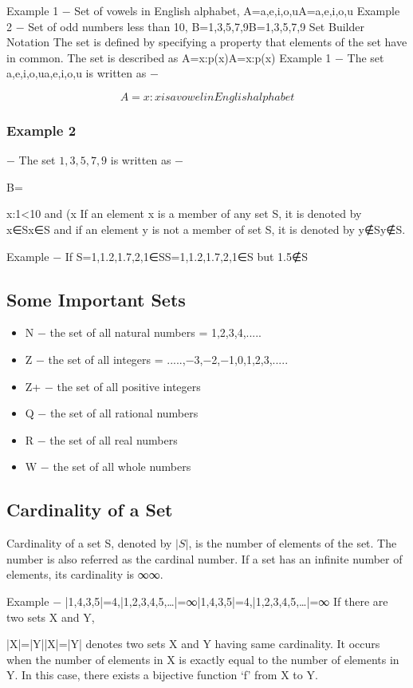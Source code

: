 \documentclass[12pt]{article}
\begin{document}
Example 1 − Set of vowels in English alphabet, A={a,e,i,o,u}A={a,e,i,o,u}
Example 2 − Set of odd numbers less than 10, B={1,3,5,7,9}B={1,3,5,7,9}
Set Builder Notation
The set is defined by specifying a property that elements of the set have in common. The set is described as A={x:p(x)}A={x:p(x)}
Example 1 − The set {a,e,i,o,u}{a,e,i,o,u} is written as −

\[A={x:x is a vowel in English alphabet}\]
\subsubsection*{Example 2} − The set ${1,3,5,7,9}$ is written as −

B={x:1\leqx<10 and (x%
If an element x is a member of any set S, it is denoted by x∈Sx∈S and if an element y is not a member of set S, it is denoted by y∉Sy∉S.

Example − If S={1,1.2,1.7,2},1∈SS={1,1.2,1.7,2},1∈S but 1.5∉S
\subsection{Some Important Sets}
\begin{itemize}
\item N − the set of all natural numbers = {1,2,3,4,.....}
\item Z − the set of all integers = {.....,−3,−2,−1,0,1,2,3,.....}
\item Z+ − the set of all positive integers
\item Q − the set of all rational numbers
\item R − the set of all real numbers
\item W − the set of all whole numbers
\end{itemize}

\subsection{Cardinality of a Set}
Cardinality of a set S, denoted by $|S|$, is the number of elements of the set. The number is also referred as the cardinal number. If a set has an infinite number of elements, its cardinality is ∞∞.

Example − |{1,4,3,5}|=4,|{1,2,3,4,5,…}|=∞|{1,4,3,5}|=4,|{1,2,3,4,5,…}|=∞
If there are two sets X and Y,

|X|=|Y||X|=|Y| denotes two sets X and Y having same cardinality. It occurs when the number of elements in X is exactly equal to the number of elements in Y. In this case, there exists a bijective function ‘f’ from X to Y.

}
\end{document}
